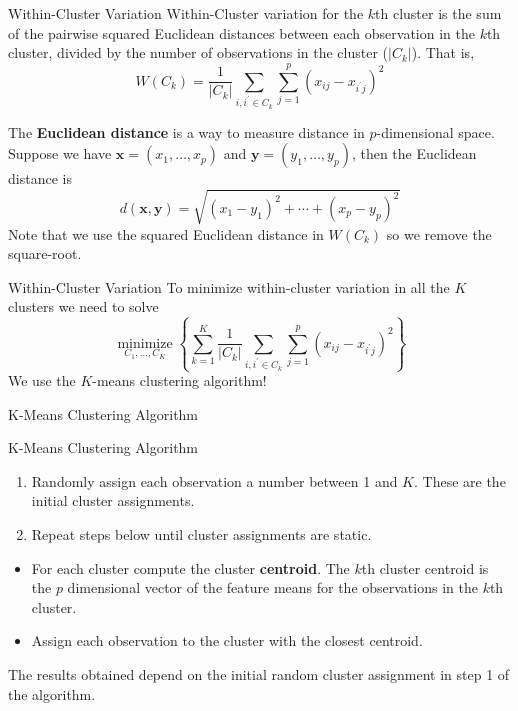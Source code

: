 \documentclass[
  ignorenonframetext,
  aspectratio=169,
]{beamer}
\begin{document}
\begin{frame}{Within-Cluster Variation}
\protect\hypertarget{within-cluster-variation}{}
Within-Cluster variation for the \(k\)th cluster is the
\alert{sum of the pairwise squared Euclidean distances between each observation in the $k$th cluster, divided by the number of observations in the cluster}
(\(|C_k|\)). That is,
\[W\left(C_{k}\right)=\frac{1}{\left|C_{k}\right|} \sum_{i, i^{\prime} \in C_{k}} \sum_{j=1}^{p}\left(x_{i j}-x_{i^{\prime} j}\right)^{2}\]

The \textbf{Euclidean distance} is a way to measure distance in
\(p\)-dimensional space. Suppose we have
\(\mathbf{x} = (x_1, \dots, x_p)\) and
\(\mathbf{y} = (y_1, \dots, y_p)\), then the Euclidean distance is
\[d(\mathbf{x}, \mathbf{y}) = \sqrt{(x_1 - y_1)^2 + \cdots + (x_p - y_p)^2}\]
Note that we use the squared Euclidean distance in \(W(C_k)\) so we
remove the square-root.
\end{frame}

\begin{frame}{Within-Cluster Variation}
\protect\hypertarget{within-cluster-variation-1}{}
To minimize within-cluster variation in all the \(K\) clusters we need
to solve \[
\underset{C_{1}, \ldots, C_{K}}{\operatorname{minimize}}\left\{\sum_{k=1}^{K} \frac{1}{\left|C_{k}\right|} \sum_{i, i^{\prime} \in C_{k}} \sum_{j=1}^{p}\left(x_{i j}-x_{i^{\prime} j}\right)^{2}\right\}
\] We use the \(K\)-means clustering algorithm!
\end{frame}

\begin{frame}{K-Means Clustering Algorithm}
\protect\hypertarget{k-means-clustering-algorithm}{}
\begin{block}{K-Means Clustering Algorithm}
\protect\hypertarget{k-means-clustering-algorithm-1}{}
\begin{enumerate}
\item
  Randomly assign each observation a number between 1 and \(K\). These
  are the initial cluster assignments.
\item
  Repeat steps below until cluster assignments are static.
\end{enumerate}

\begin{itemize}
\item
  For each cluster compute the cluster \textbf{centroid}. The \(k\)th
  cluster centroid is the \(p\) dimensional vector of the feature means
  for the observations in the \(k\)th cluster.
\item
  Assign each observation to the cluster with the closest centroid.
\end{itemize}

The results obtained depend on the initial random cluster assignment in
step 1 of the algorithm.
\end{block}
\end{frame}
\end{document}
